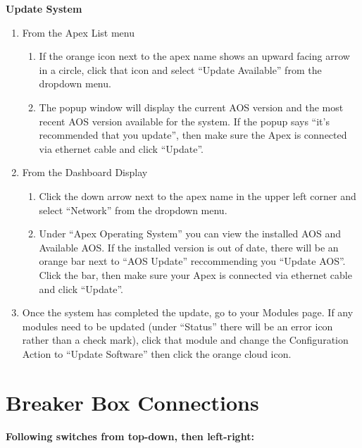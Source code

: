 \documentclass[]{book}
\providecommand{\tightlist}{%
  \setlength{\itemsep}{0pt}\setlength{\parskip}{0pt}}
\begin{document}
 \textbf{Update System}

\begin{enumerate}
\def\labelenumi{\arabic{enumi}.}
\tightlist
\item
  From the Apex List menu

  \begin{enumerate}
  \def\labelenumii{\arabic{enumii}.}
  \tightlist
  \item
    If the orange icon next to the apex name shows an upward facing
    arrow in a circle, click that icon and select ``Update Available''
    from the dropdown menu.
  \item
    The popup window will display the current AOS version and the most
    recent AOS version available for the system. If the popup says
    ``it's recommended that you update'', then make sure the Apex is
    connected via ethernet cable and click ``Update''.
  \end{enumerate}
\item
  From the Dashboard Display

  \begin{enumerate}
  \def\labelenumii{\arabic{enumii}.}
  \tightlist
  \item
    Click the down arrow next to the apex name in the upper left corner
    and select ``Network'' from the dropdown menu.
  \item
    Under ``Apex Operating System'' you can view the installed AOS and
    Available AOS. If the installed version is out of date, there will
    be an orange bar next to ``AOS Update'' reccommending you ``Update
    AOS''. Click the bar, then make sure your Apex is connected via
    ethernet cable and click ``Update''.
  \end{enumerate}
\item
  Once the system has completed the update, go to your Modules page. If
  any modules need to be updated (under ``Status'' there will be an
  error icon rather than a check mark), click that module and change the
  Configuration Action to ``Update Software'' then click the orange
  cloud icon.
\end{enumerate}

\chapter{Breaker Box Connections}\label{breaker-box-connections}

\textbf{Following switches from top-down, then left-right:}
\end{document}
